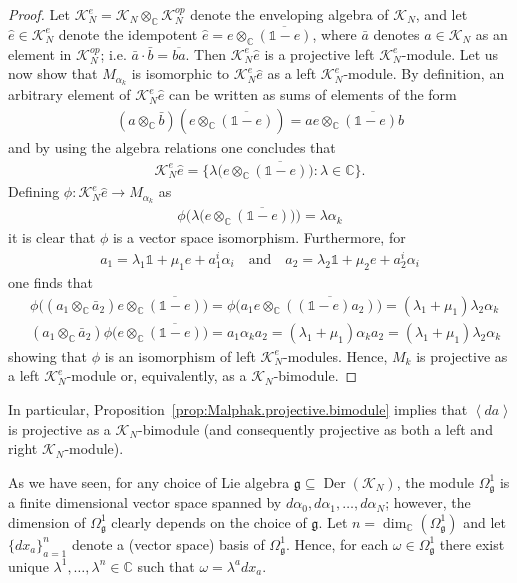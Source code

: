 \documentclass{amsart}
\newcommand{\complex}{\mathbb{C}}
\newcommand{\angles}[1]{\left\langle #1 \right\rangle}
\newcommand{\paraa}[1]{\big(#1\big)}
\theoremstyle{definition}
\theoremstyle{remark}
\numberwithin{equation}{section}
\newcommand{\K}{\mathcal{K}}
\renewcommand{\mid}{\mathds{1}}
\newcommand{\KN}{\K_N}
\newcommand{\Der}{\operatorname{Der}}
\newcommand{\qand}{\quad\text{and}\quad}
\newcommand{\g}{\mathfrak{g}}
\newcommand{\Omegag}[1]{\Omega^{#1}_{\g}}
\newcommand{\Omegaoneg}{\Omega^1_{\g}}
\newcommand{\otimesC}{\otimes_{\complex}}
\begin{document}
\begin{proof}
  Let $\KN^e=\KN\otimesC\KN^{op}$ denote the enveloping algebra of
  $\KN$, and let $\hat{e}\in\KN^e$ denote the idempotent
  $\hat{e}=e\otimesC\overline{(\mid-e)}$, where $\bar{a}$ denotes
  $a\in\KN$ as an element in $\KN^{op}$;
  i.e. $\bar{a}\cdot\bar{b}=\overline{ba}$. Then $\KN^e\hat{e}$ is a
  projective left $\KN^e$-module. Let us now show that $M_{\alpha_k}$
  is isomorphic to $\KN^e\hat{e}$ as a left $\KN^e$-module. By
  definition, an arbitrary element of $\KN^e\hat{e}$ can be written as
  sums of elements of the form
  \begin{align*}
    (a\otimesC\bar{b})(e\otimesC\overline{(\mid-e)})
    =ae\otimesC\overline{(\mid-e)b}
  \end{align*}
  and by using the algebra relations one concludes that
  \begin{align*}
    \KN^e\hat{e} = \{\lambda\paraa{e\otimesC\overline{(\mid-e)}}:\lambda\in\complex\}.
  \end{align*}
  Defining $\phi:\KN^e\hat{e}\to M_{\alpha_k}$ as
  \begin{align*}
    \phi\paraa{\lambda\paraa{e\otimesC\overline{(\mid-e)}}} = \lambda\alpha_k
  \end{align*}
  it is clear that $\phi$ is a vector space isomorphism. Furthermore, for
  \begin{align*}
    a_1 = \lambda_1\mid+\mu_1e + a_1^i\alpha_i\qand
    a_2 = \lambda_2\mid+\mu_2e + a_2^i\alpha_i
  \end{align*}
  one finds that
  \begin{align*}
    &\phi\paraa{(a_1\otimesC \bar{a}_2)e\otimesC\overline{(\mid-e)}}
      =\phi\paraa{a_1e\otimesC\overline{((\mid-e)a_2)}}
      =(\lambda_1+\mu_1)\lambda_2\alpha_k\\
    &(a_1\otimesC\bar{a}_2)\phi\paraa{e\otimesC\overline{(\mid-e)}}
      = a_1\alpha_k a_2 = (\lambda_1+\mu_1)\alpha_k a_2 = (\lambda_1+\mu_1)\lambda_2\alpha_k
  \end{align*}
  showing that $\phi$ is an isomorphism of left
  $\KN^e$-modules. Hence, $M_k$ is projective as a left $\KN^e$-module
  or, equivalently, as a $\KN$-bimodule.
\end{proof}

\noindent
In particular, Proposition~\ref{prop:Malphak.projective.bimodule}
implies that $\angles{da}$ is projective as a
$\KN$-bimodule (and consequently projective as both a left and right
$\KN$-module).

As we have seen, for any choice of Lie algebra $\g\subseteq\Der(\KN)$,
the module $\Omegaoneg$ is a finite dimensional vector space spanned by
$d\alpha_0,d\alpha_1,\ldots,d\alpha_N$; however, the dimension of $\Omegaoneg$
clearly depends on the choice of $\g$. Let
$n=\dim_{\complex}(\Omegag{1})$ and let $\{dx_a\}_{a=1}^n$ denote a (vector
space) basis of $\Omegag{1}$. Hence, for each $\omega\in\Omegag{1}$
there exist unique $\lambda^1,\ldots,\lambda^n\in\complex$ such that
$\omega=\lambda^adx_a$.
\end{document}
